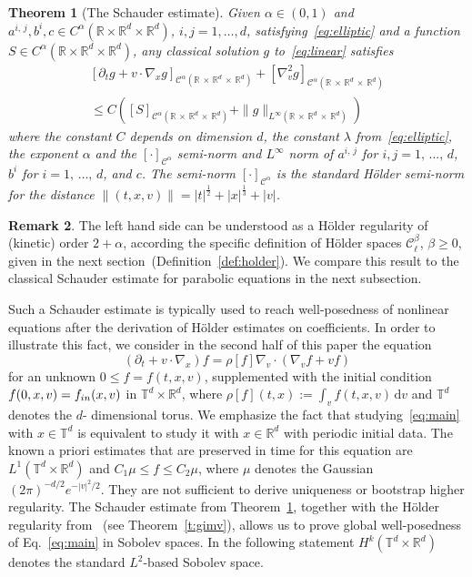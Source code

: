 \documentclass[10pt]{amsart}
\newtheorem{theo}{Theorem}[section]
\theoremstyle{definition}\newtheorem{defi}[theo]{Definition}\newtheorem{rema}[theo]{Remark}\newtheorem{exam}[theo]{Example}\newtheorem{exem}[theo]{Example}\newtheorem{nota}[theo]{Notation}
\newcommand{\R}{\mathbb{R}}
\newcommand{\T}{\mathbb{T}}
\newcommand{\cC}{\mathcal{C}}
\newcommand{\dd}{{\, \mathrm d}}
\begin{document}
\begin{theo}[The Schauder estimate]\label{thm:variable}
Given $\alpha \in (0,1)$ and $a^{i,\,j},b^i,c \in C^\alpha(\R \times \R^d \times \R^d)$, $i,j=1,\dots,d$, satisfying~\eqref{eq:elliptic} and a function $S \in C^\alpha(\R \times \R^d \times \R^d)$, any classical solution $g$ to~\eqref{eq:linear} satisfies
\begin{multline}\label{eq:schauder-main}
\left[\partial_t g + v \cdot \nabla_x g
\right]_{\cC^\alpha\left(\R\,\times\,\R^d\,\times\,\R^d\right)} + \left[\nabla_v ^2 g
\right]_{\cC^\alpha\left(\R\,\times\,\R^d\,\times\,\R^d\right)}\\
\le C \left([S]_{\cC^\alpha\left(\R\,\times\,\R^d\,\times\,\R^d\right)} +
\|g\|_{L^\infty\left(\R\,\times\,\R^d\,\times\,\R^d\right)}\right)
\end{multline}
where the constant $C$ depends on dimension $d$, the constant $\lambda$ from~\eqref{eq:elliptic}, the exponent $\alpha$ and the $[\cdot]_{\cC^\alpha}$ semi-norm and $L^\infty$ norm of $a^{i,\,j}$ for $i,j=1,\,\dots,\,d$, $b^i$ for $i=1,\,\dots,\,d$, and $c$. The semi-norm $[\cdot]_{\cC^\alpha}$ is the standard H\"older semi-norm for the distance $\|(t,x,v)\|=|t|^{\frac12} + |x|^{\frac13} +|v|$.
\end{theo}


\begin{rema}
The left hand side can be understood as a H\"older regularity of (kinetic) order $2+\alpha$, according the specific definition of H\"older spaces $\cC_\ell^\beta$, $\beta \ge 0$, given in the next section~(Definition~\ref{def:holder}). We compare this result to the classical Schauder estimate for parabolic equations in the next subsection.
\end{rema}

Such a Schauder estimate is typically used to reach well-posedness of nonlinear equations after the derivation of H\"older estimates on coefficients. In order to illustrate this fact, we consider in the second half of this paper the equation
\begin{equation}\label{eq:main}
\left(\partial_t + v \cdot \nabla_x\right) f = \rho[f] \nabla_v \cdot \left(\nabla_v f + v f \right)
\end{equation}
for an unknown $0 \le f =f(t,x,v)$, supplemented with the initial condition $f (0,x,v)\linebreak=f_{in}(x,v)$ in $\T^d \times \R^d$, where $\rho[f] (t,x):= \int_v f(t,x,v) \dd v$ and $\T^d$ denotes the $d$- dimensional torus. We emphasize the fact that studying~\eqref{eq:main} with $x \in \T^d$ is equivalent to study it with $x \in \R^d$ with periodic initial data. The known a priori estimates that are preserved in time for this equation are $L^1(\T^d \times \R^d)$ and $C_1 \mu \le f \le C_2 \mu$, where $\mu$ denotes the Gaussian $(2\pi)^{-d/2} e^{-|v|^2/2}$. They are not sufficient to derive uniqueness or bootstrap higher regularity. The Schauder estimate from Theorem~\ref{thm:variable}, together with the H\"older regularity from~\cite{gimv} (see Theorem~\ref{t:gimv}), allows us to prove global well-posedness of Eq.~\eqref{eq:main} in Sobolev spaces. In the following statement $H^k(\T^d \times \R^d)$ denotes the standard $L^2$-based Sobolev space.
\end{document}
